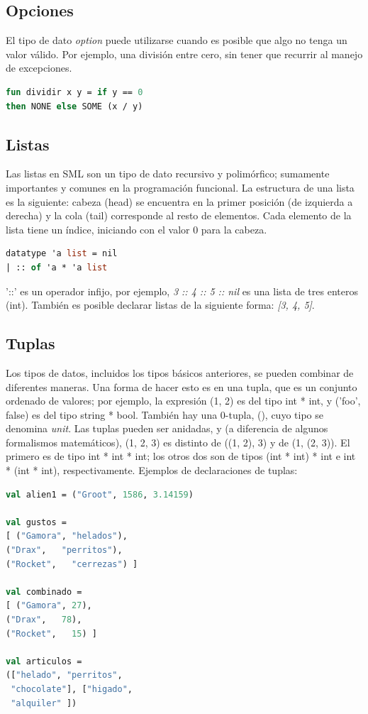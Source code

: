 \documentclass[10pt,journal,compsoc]{IEEEtran}
\begin{document}
\subsection{Opciones}
El tipo de dato \textit{option} puede utilizarse cuando es posible que algo no tenga un valor v\'alido. Por ejemplo, una divisi\'on entre cero, sin tener que recurrir al manejo de excepciones.
\begin{lstlisting}[language=ML, caption=Ejemplo Divisi\'on entre 0]
fun dividir x y = if y == 0
then NONE else SOME (x / y)
\end{lstlisting}

\subsection{Listas}
Las listas en SML son un tipo de dato recursivo y polim\'orfico; sumamente importantes y comunes en la programaci\'on funcional. La estructura de una lista es la siguiente: cabeza (head) se encuentra en la primer posici\'on (de izquierda a derecha) y la cola (tail) corresponde al resto de elementos. Cada elemento de la lista tiene un \'indice, iniciando con el valor 0 para la cabeza.
\begin{lstlisting}[language=ML, caption=Ejemplo Listas]
datatype 'a list = nil
| :: of 'a * 'a list
\end{lstlisting}
'::' es un operador infijo, por ejemplo, \textit{3 :: 4 :: 5 :: nil} es una lista de tres enteros (int). Tambi\'en es posible declarar listas de la siguiente forma: \textit{[3, 4, 5]}.

\subsection{Tuplas}
Los tipos de datos, incluidos los tipos b\'asicos anteriores, se pueden combinar de diferentes maneras. Una forma de hacer esto es en una tupla, que es un conjunto ordenado de valores; por ejemplo, la expresi\'on (1, 2) es del tipo int * int, y ('foo', false) es del tipo string * bool. Tambi\'en hay una 0-tupla, (), cuyo tipo se denomina \textit{unit}.
Las tuplas pueden ser anidadas, y (a diferencia de algunos formalismos matem\'aticos), (1, 2, 3) es distinto de ((1, 2), 3) y de (1, (2, 3)). El primero es de tipo int * int * int; los otros dos son de tipos (int * int) * int e int * (int * int), respectivamente. Ejemplos de declaraciones de tuplas:
\begin{lstlisting}[language=ML, caption=Ejemplo Listas]
val alien1 = ("Groot", 1586, 3.14159)

val gustos = 
[ ("Gamora", "helados"),
("Drax",   "perritos"),
("Rocket",   "cerrezas") ]

val combinado = 
[ ("Gamora", 27),
("Drax",   78),
("Rocket",   15) ]

val articulos =
(["helado", "perritos",
 "chocolate"], ["higado", 
 "alquiler" ])
\end{lstlisting}
\end{document}

